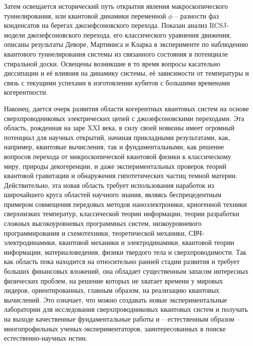 \documentclass[14pt, a4paper]{extarticle}
\begin{document}
Затем освещается исторический путь открытия явления макроскопического туннелирования, или квантовой динамики переменной $\phi$ -- разности фаз конденсатов на берегах джозефсоновского перехода. Показан анализ RCSJ-модели джозефсоновского перехода, его классического уравнения движения, описаны результаты Деворе, Мартиниса и Кларка в эксперименте по наблюдению квантового туннелирования системы из связанного состояния в потенциале стиральной доски. Освещены возникшие в то время вопросы касательно диссипации и её влияния на динамику системы, её зависимости от температуры и связь с текущими успехами в изготовлении кубитов с большими временами когерентности.

Наконец, дается очерк развития области когерентных квантовых систем на основе сверхпроводниковых электрических цепей с джозефсоновскими переходами. Эта область, рожденная на заре XXI века, в силу своей новизны имеет огромный потенциал для научных открытий, начиная прикладными результатами, как, например, квантовые вычисления, так и фундаментальными, как решение вопросов перехода от микроскопической квантовой физики к классическому миру, природы декогеренции, и даже экспериментальных проверок теорий квантовой гравитации и обнаружения гипотетических частиц темной материи. Действительно, эта новая область требует использования наработок из широчайшего круга областей научного знания, являясь беспрецедентным примером совмещения передовых методов наноэлектроники, криогенной техники сверхнизких температур, классической теории информации, теории разработки сложных высокоуровневых программных систем, низкоуровневого программирования и схемотехники, теоретической механики, СВЧ-электродинамики, квантовой механики и электродинамики, квантовой теории информации, материаловедения, физики твердого тела и сверхпроводимости. Так как область пока находится на относительно ранней стадии развития и требует больших финансовых вложений, она обладает существенным запасом интересных физических проблем, на решение которых не хватает времени у мировых лидеров, ориентированных, главным образом, на реализацию квантовых вычислений. Это означает, что можно создавать новые экспериментальные лаборатории для исследования сверхпроводниковых квантовых систем и получать на выходе качественные фундаментальные работы и -- естественным образом -- многопрофильных ученых-экспериментаторов, заинтересованных в поиске естественно-научных истин.
\end{document}
